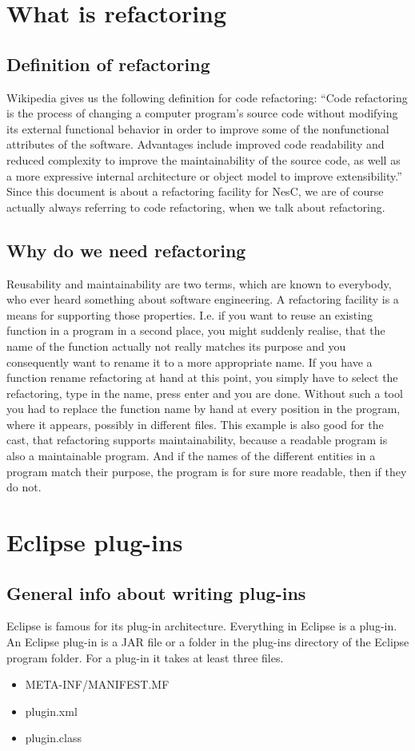 \documentclass[a4paper,10pt]{report}
\begin{document}
\tableofcontents

\part{What is refactoring}
\chapter{Definition of refactoring}
Wikipedia gives us the following definition for code refactoring:
``Code refactoring is the process of changing a computer program's source code without modifying its external functional behavior in order to improve some of the nonfunctional attributes of the software. 
Advantages include improved code readability  and reduced complexity to improve the maintainability of the source code, as well as a more expressive internal architecture or object model to improve extensibility.''
Since this document is about a refactoring facility for NesC, we are of course actually always referring to code refactoring, when we talk about refactoring.

\chapter{Why do we need refactoring}
Reusability and maintainability are two terms, which are known to everybody, who ever heard something about software engineering. 
A refactoring facility is a means for supporting those properties. I.e. if you want to reuse an existing function in a program in a second place,
you might suddenly realise, that the name of the function actually not really matches its purpose and you consequently want to rename it to a more appropriate name.
If you have a function rename refactoring at hand at this point, you simply have to select the refactoring, type in the name, press enter and you are done. 
Without such a tool you had to replace the function name by hand at every position in the program, where it appears, possibly in different files.
This example is also good for the cast, that refactoring supports maintainability, because a readable program is also a maintainable program. 
And if the names of the different entities in a program match their purpose, the program is for sure more readable, then if they do not.

\part{Eclipse plug-ins}
\chapter{General info about writing plug-ins}
Eclipse is famous for its plug-in architecture. Everything in Eclipse is a plug-in. An Eclipse plug-in is a JAR file or a folder in the plug-ins directory of the Eclipse program folder.
For a plug-in it takes at least three files.
\begin{itemize}
  \item META-INF/MANIFEST.MF
  \item plugin.xml
  \item plugin.class
\end{itemize}
\end{document}

